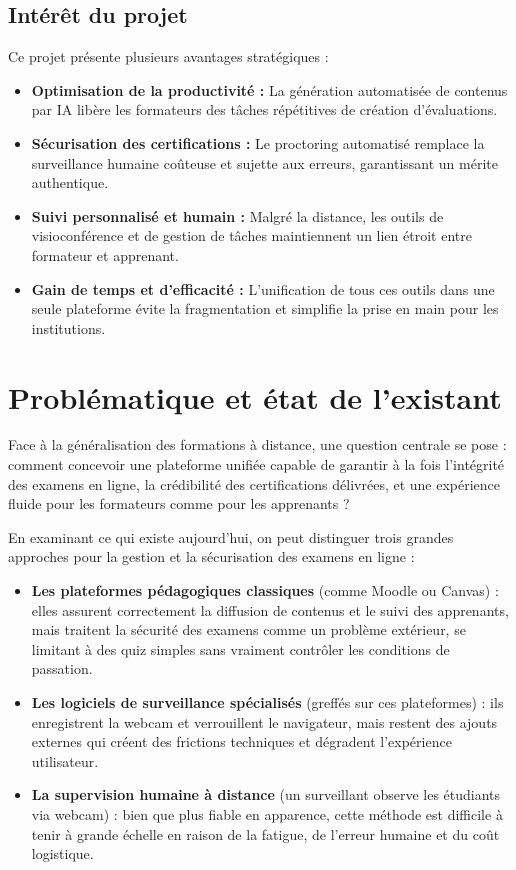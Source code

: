 \subsection{Intérêt du projet}
Ce projet présente plusieurs avantages stratégiques :
\begin{itemize}
    \item \textbf{Optimisation de la productivité :} La génération automatisée de contenus par IA libère les formateurs des tâches répétitives de création d'évaluations.
    \item \textbf{Sécurisation des certifications :} Le proctoring automatisé remplace la surveillance humaine coûteuse et sujette aux erreurs, garantissant un mérite authentique.
    \item \textbf{Suivi personnalisé et humain :} Malgré la distance, les outils de visioconférence et de gestion de tâches maintiennent un lien étroit entre formateur et apprenant.
    \item \textbf{Gain de temps et d'efficacité :} L'unification de tous ces outils dans une seule plateforme évite la fragmentation et simplifie la prise en main pour les institutions.
\end{itemize}

\section{Problématique et état de l’existant}
Face à la généralisation des formations à distance, une question centrale se pose : comment concevoir une plateforme unifiée capable de garantir à la fois l'intégrité des examens en ligne, la crédibilité des certifications délivrées, et une expérience fluide pour les formateurs comme pour les apprenants ?

En examinant ce qui existe aujourd'hui, on peut distinguer trois grandes approches pour la gestion et la sécurisation des examens en ligne :
\begin{itemize}
    \item \textbf{Les plateformes pédagogiques classiques} (comme Moodle ou Canvas) : elles assurent correctement la diffusion de contenus et le suivi des apprenants, mais traitent la sécurité des examens comme un problème extérieur, se limitant à des quiz simples sans vraiment contrôler les conditions de passation.
    \item \textbf{Les logiciels de surveillance spécialisés} (greffés sur ces plateformes) : ils enregistrent la webcam et verrouillent le navigateur, mais restent des ajouts externes qui créent des frictions techniques et dégradent l'expérience utilisateur.
    \item \textbf{La supervision humaine à distance} (un surveillant observe les étudiants via webcam) : bien que plus fiable en apparence, cette méthode est difficile à tenir à grande échelle en raison de la fatigue, de l'erreur humaine et du coût logistique.
\end{itemize}

